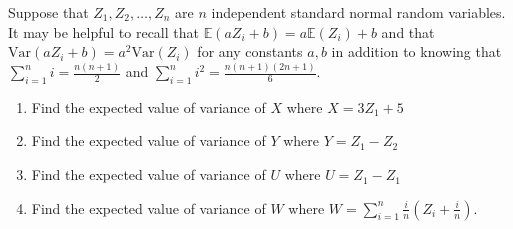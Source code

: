 \documentclass[11pt]{article}
\begin{document}
\item 
   Suppose that $Z_1, Z_2, \ldots, Z_n$ are $n$ independent standard normal random variables.
   It may be helpful to recall that $\mathbb{E}(a Z_i + b) = a \mathbb{E}(Z_i) + b$ and that $\text{Var}(a Z_i + b) = a^2 \text{Var}(Z_i)$ for any constants $a, b$ in addition to knowing that $\sum_{i=1}^{n} i = \frac{n(n+1)}{2}$ and $\sum_{i=1}^n i^2 = \frac{n(n+1)(2n+1)}{6}$.

   \begin{enumerate}
   \item 
      Find the expected value of variance of $X$ where $X = 3 Z_1 + 5$

   \item 
      Find the expected value of variance of $Y$ where $Y = Z_1 - Z_2$

   \item 
      Find the expected value of variance of $U$ where $U = Z_1 - Z_1$

   \item 
      Find the expected value of variance of $W$ where $W = \sum_{i=1}^n \frac{i}{n} \left(Z_i + \frac{i}{n}\right)$.
   \end{enumerate}
\end{document}
